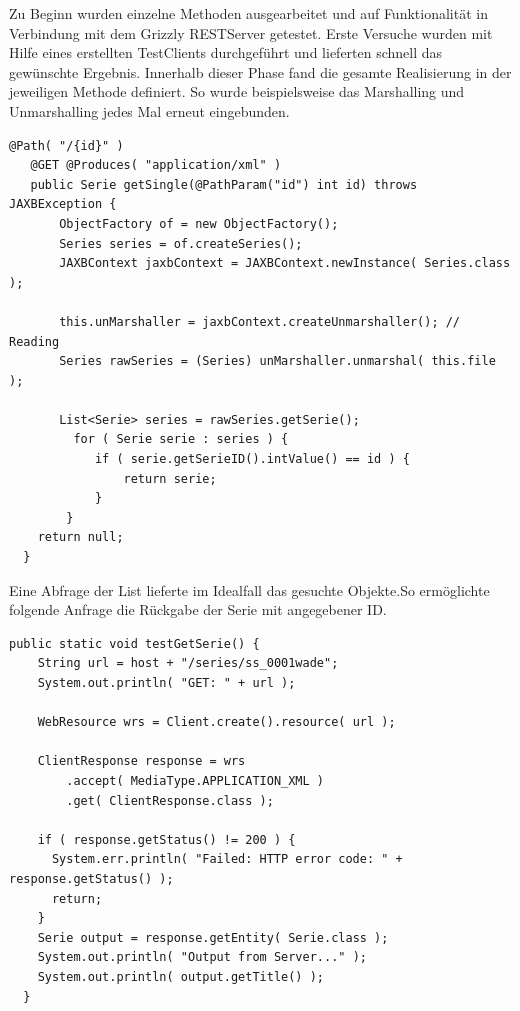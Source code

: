 \documentclass[a4paper]{article}
\begin{document}
\newpage
Zu Beginn wurden einzelne Methoden ausgearbeitet und auf Funktionalität in Verbindung mit dem Grizzly RESTServer getestet. Erste Versuche wurden mit Hilfe eines erstellten TestClients durchgeführt und lieferten schnell das gewünschte Ergebnis.
Innerhalb dieser Phase fand  die gesamte Realisierung in der jeweiligen Methode definiert. So wurde beispielsweise das Marshalling und Unmarshalling jedes Mal erneut eingebunden.

\begin{lstlisting}[label=listsservice,caption= GET Testmethode der SeriesID]
   @Path( "/{id}" )
   @GET @Produces( "application/xml" )
   public Serie getSingle(@PathParam("id") int id) throws JAXBException {
       ObjectFactory of = new ObjectFactory();
       Series series = of.createSeries();
       JAXBContext jaxbContext = JAXBContext.newInstance( Series.class );

       this.unMarshaller = jaxbContext.createUnmarshaller(); // Reading
       Series rawSeries = (Series) unMarshaller.unmarshal( this.file );

       List<Serie> series = rawSeries.getSerie();
         for ( Serie serie : series ) {
            if ( serie.getSerieID().intValue() == id ) {
                return serie;
            }
        }
    return null;
  }
\end{lstlisting}

Eine Abfrage der List lieferte im Idealfall das gesuchte Objekte.So ermöglichte folgende Anfrage die Rückgabe der Serie mit angegebener ID.

\begin{lstlisting}[label=testclient,caption= Anfrage des Testclients nach Serie mit angegebener ID]
public static void testGetSerie() {
    String url = host + "/series/ss_0001wade";
    System.out.println( "GET: " + url );

    WebResource wrs = Client.create().resource( url );

    ClientResponse response = wrs
        .accept( MediaType.APPLICATION_XML )
        .get( ClientResponse.class );

    if ( response.getStatus() != 200 ) {
      System.err.println( "Failed: HTTP error code: " + response.getStatus() );
      return;
    }
    Serie output = response.getEntity( Serie.class );
    System.out.println( "Output from Server..." );
    System.out.println( output.getTitle() );
  }
\end{lstlisting}

\newpage
\end{document}
